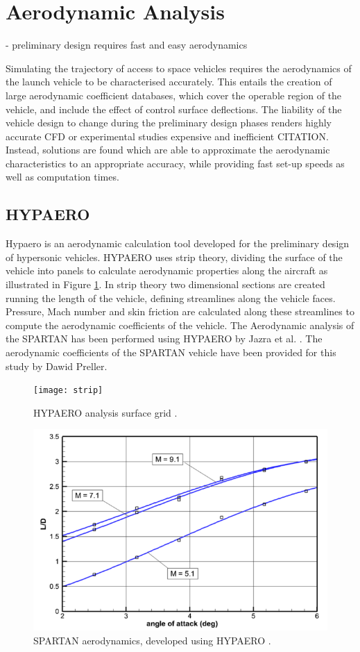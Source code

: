 \section{Aerodynamic Analysis}
- preliminary design requires fast and easy aerodynamics 

Simulating the trajectory of access to space vehicles requires the aerodynamics of the launch vehicle to be characterised accurately. This entails the creation of large aerodynamic coefficient databases, which cover the operable region of the vehicle, and include the effect of control surface deflections. The liability of the vehicle design to change during the preliminary design phases renders highly accurate CFD or experimental studies expensive and inefficient CITATION. Instead, solutions are found which are able to approximate the aerodynamic characteristics to an appropriate accuracy, while providing fast set-up speeds as well as computation times. 

\subsection{HYPAERO}

Hypaero is an aerodynamic calculation tool developed for the preliminary design of hypersonic vehicles. 
HYPAERO uses strip theory, dividing the surface of the vehicle into panels to calculate aerodynamic properties along the aircraft as illustrated in Figure \ref{fig:strip}. In strip theory two dimensional sections are created running the length of the vehicle, defining streamlines along the vehicle faces. Pressure, Mach number and skin friction are calculated along these streamlines to compute the aerodynamic coefficients of the vehicle. The Aerodynamic analysis of the SPARTAN has been performed using HYPAERO by Jazra et al. \cite{Jazra2013}. The aerodynamic coefficients of the SPARTAN vehicle have been provided for this study by Dawid Preller.

\begin{figure}[ht]
	\centering
	\texttt{[image: strip]}
	\caption{HYPAERO analysis surface grid \cite{Jazra2013}.}
	\label{fig:strip}
\end{figure}

\begin{figure}
\centering
\includegraphics[width=0.7\linewidth]{figures/2_literature-review/HYPAERO-aero}
\caption{SPARTAN aerodynamics, developed using HYPAERO \cite{Preller2017}.}
\label{fig:HYPAERO-aero}
\end{figure}


